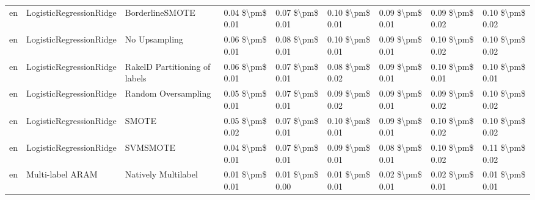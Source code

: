 \begin{tabular}{lllllllll}
      en &         LogisticRegressionRidge &               BorderlineSMOTE & 0.04 \$\textbackslash pm\$ 0.01 &           0.07 \$\textbackslash pm\$ 0.01 &       0.10 \$\textbackslash pm\$ 0.01 &        0.09 \$\textbackslash pm\$ 0.01 &                         0.09 \$\textbackslash pm\$ 0.02 &     0.10 \$\textbackslash pm\$ 0.02 \\
      en &         LogisticRegressionRidge &                 No Upsampling & 0.06 \$\textbackslash pm\$ 0.01 &           0.08 \$\textbackslash pm\$ 0.01 &       0.10 \$\textbackslash pm\$ 0.01 &        0.09 \$\textbackslash pm\$ 0.01 &                         0.10 \$\textbackslash pm\$ 0.02 &     0.10 \$\textbackslash pm\$ 0.02 \\
      en &         LogisticRegressionRidge & RakelD Partitioning of labels & 0.06 \$\textbackslash pm\$ 0.01 &           0.07 \$\textbackslash pm\$ 0.01 &       0.08 \$\textbackslash pm\$ 0.02 &        0.09 \$\textbackslash pm\$ 0.01 &                         0.10 \$\textbackslash pm\$ 0.01 &     0.10 \$\textbackslash pm\$ 0.01 \\
      en &         LogisticRegressionRidge &           Random Oversampling & 0.05 \$\textbackslash pm\$ 0.01 &           0.07 \$\textbackslash pm\$ 0.01 &       0.09 \$\textbackslash pm\$ 0.02 &        0.09 \$\textbackslash pm\$ 0.01 &                         0.09 \$\textbackslash pm\$ 0.02 &     0.10 \$\textbackslash pm\$ 0.02 \\
      en &         LogisticRegressionRidge &                         SMOTE & 0.05 \$\textbackslash pm\$ 0.02 &           0.07 \$\textbackslash pm\$ 0.01 &       0.10 \$\textbackslash pm\$ 0.01 &        0.09 \$\textbackslash pm\$ 0.01 &                         0.10 \$\textbackslash pm\$ 0.02 &     0.10 \$\textbackslash pm\$ 0.02 \\
      en &         LogisticRegressionRidge &                      SVMSMOTE & 0.04 \$\textbackslash pm\$ 0.01 &           0.07 \$\textbackslash pm\$ 0.01 &       0.09 \$\textbackslash pm\$ 0.01 &        0.08 \$\textbackslash pm\$ 0.01 &                         0.10 \$\textbackslash pm\$ 0.02 &     0.11 \$\textbackslash pm\$ 0.02 \\
      en &                Multi-label ARAM &           Natively Multilabel & 0.01 \$\textbackslash pm\$ 0.01 &           0.01 \$\textbackslash pm\$ 0.00 &       0.01 \$\textbackslash pm\$ 0.01 &        0.02 \$\textbackslash pm\$ 0.01 &                         0.02 \$\textbackslash pm\$ 0.01 &     0.01 \$\textbackslash pm\$ 0.01 \\

\end{tabular}
